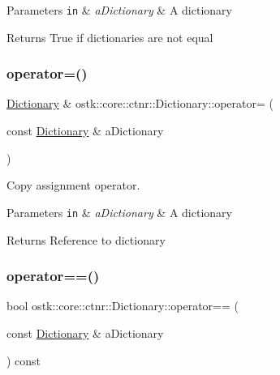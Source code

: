\begin{DoxyParams}[1]{Parameters}
\mbox{\tt in}  & {\em a\+Dictionary} & A dictionary \\
\hline
\end{DoxyParams}
\begin{DoxyReturn}{Returns}
True if dictionaries are not equal 
\end{DoxyReturn}
\mbox{\label{classostk_1_1core_1_1ctnr_1_1_dictionary_afc7bcc4702fd4549806a98b8f22b7c03}} 
\subsubsection{\texorpdfstring{operator=()}{operator=()}}
{\footnotesize\ttfamily \hyperlink{classostk_1_1core_1_1ctnr_1_1_dictionary}{Dictionary} \& ostk\+::core\+::ctnr\+::\+Dictionary\+::operator= (\begin{DoxyParamCaption}\item[{const \hyperlink{classostk_1_1core_1_1ctnr_1_1_dictionary}{Dictionary} \&}]{a\+Dictionary }\end{DoxyParamCaption})}



Copy assignment operator. 


\begin{DoxyParams}[1]{Parameters}
\mbox{\tt in}  & {\em a\+Dictionary} & A dictionary \\
\hline
\end{DoxyParams}
\begin{DoxyReturn}{Returns}
Reference to dictionary 
\end{DoxyReturn}
\mbox{\label{classostk_1_1core_1_1ctnr_1_1_dictionary_ac85986e065268cb0a2f3552cfe3e6775}} 
\subsubsection{\texorpdfstring{operator==()}{operator==()}}
{\footnotesize\ttfamily bool ostk\+::core\+::ctnr\+::\+Dictionary\+::operator== (\begin{DoxyParamCaption}\item[{const \hyperlink{classostk_1_1core_1_1ctnr_1_1_dictionary}{Dictionary} \&}]{a\+Dictionary }\end{DoxyParamCaption}) const}




